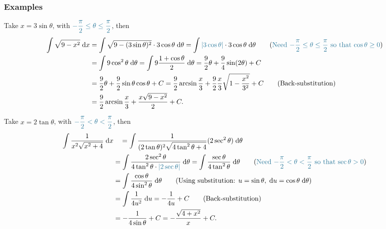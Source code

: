 \subsubsection{Examples}
\begin{ex} Take $x=3\sin \theta$, with $\blue{-\dfrac{\pi}{2} \leq \theta \leq \dfrac{\pi}{2}}$, then 
    \begin{align*}
    \int \sqrt{9 - x^2} \dd x &= \int \sqrt{9 - (3\sin \theta)^2} \cdot 3 \cos \theta \dd \theta = \int \blue{|3 \cos \theta|} \cdot 3 \cos \theta \dd \theta \tag{\blue{Need $-\dfrac{\pi}{2}\leq \theta \leq \dfrac{\pi}{2}$ so that $\cos \theta \geq 0$}}\\
    &= \int 9 \cos^2 \theta \dd \theta = \int 9 \dfrac{1+\cos \theta}{2} \dd \theta =  \dfrac{9}{2} \theta + \dfrac{9}{4} \sin (2\theta) + C\\
    &= \dfrac{9}{2} \theta + \dfrac{9}{2} \sin \theta \cos \theta + C = \dfrac{9}{2} \arcsin \dfrac{x}{3} + \dfrac{9}{2} \dfrac{x}{3}\sqrt{1-\dfrac{x^2}{3^2}} + C \tag{Back-substitution}\\
    &= \dfrac{9}{2} \arcsin \dfrac{x}{3} + \dfrac{x\sqrt{9-x^2}}{2} + C.
\end{align*}
\end{ex}

\begin{ex} Take $x=2\tan \theta$, with $\blue{-\dfrac{\pi}{2} < \theta < \dfrac{\pi}{2}}$, then 
    \begin{align*}
    \int \dfrac{1}{x^2 \sqrt{x^2 + 4}} \dd x &\quad = \int \dfrac{1}{(2 \tan \theta)^2 \sqrt{4 \tan^2 \theta + 4}} (2 \sec^2 \theta) \dd \theta \\
    &= \int \dfrac{2 \sec^2 \theta}{4 \tan^2 \theta \cdot \blue{|2 \sec \theta|}} \dd \theta = \int \dfrac{\sec \theta}{4 \tan^2 \theta} \dd \theta \tag{\blue{Need $-\dfrac{\pi}{2}<\theta <\dfrac{\pi}{2}$ so that $\sec \theta > 0$}}\\
    &= \int \dfrac{\cos \theta}{4 \sin^2 \theta} \dd \theta \tag{Using substitution: $u = \sin \theta, \dd u = \cos \theta \dd \theta$} \\
    &= \int \dfrac{1}{4 u^2} \dd u = -\dfrac{1}{4u} + C
    \tag{Back-substitution}\\
    &= -\dfrac{1}{4 \sin \theta} + C = -\dfrac{\sqrt{4+x^2}}{x} + C.
\end{align*}
\end{ex}

